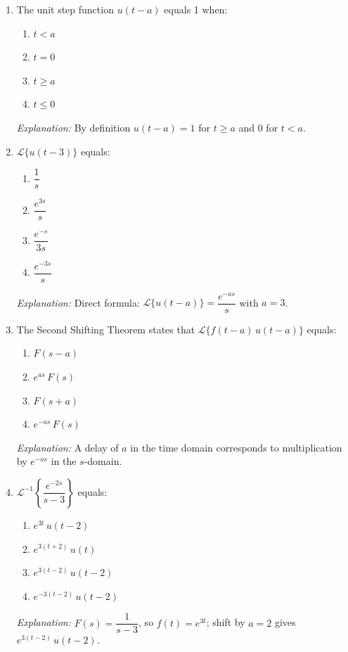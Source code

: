\documentclass[12pt,a4paper]{article}
\begin{document}
\begin{enumerate}[label=\textbf{MCQ \arabic*.}]

\item The unit step function $u(t-a)$ equals 1 when:
  \begin{enumerate}[label=(\alph*)]
    \item $t < a$
    \item $t = 0$
    \item \textbf{$t \geq a$}
    \item $t \leq 0$
  \end{enumerate}
  \textit{Explanation:} By definition $u(t-a) = 1$ for $t \geq a$ and 0 for $t < a$.

\item $\mathcal{L}\{u(t-3)\}$ equals:
  \begin{enumerate}[label=(\alph*)]
    \item $\dfrac{1}{s}$
    \item $\dfrac{e^{3s}}{s}$
    \item $\dfrac{e^{-s}}{3s}$
    \item \textbf{$\dfrac{e^{-3s}}{s}$}
  \end{enumerate}
  \textit{Explanation:} Direct formula: $\mathcal{L}\{u(t-a)\} = \dfrac{e^{-as}}{s}$ with $a=3$.

\item The Second Shifting Theorem states that $\mathcal{L}\{f(t-a)\,u(t-a)\}$ equals:
  \begin{enumerate}[label=(\alph*)]
    \item $F(s-a)$
    \item $e^{as}\,F(s)$
    \item $F(s+a)$
    \item \textbf{$e^{-as}\,F(s)$}
  \end{enumerate}
  \textit{Explanation:} A delay of $a$ in the time domain corresponds to multiplication by $e^{-as}$ in the $s$-domain.

\item $\mathcal{L}^{-1}\!\left\{\dfrac{e^{-2s}}{s-3}\right\}$ equals:
  \begin{enumerate}[label=(\alph*)]
    \item $e^{3t}\,u(t-2)$
    \item $e^{3(t+2)}\,u(t)$
    \item \textbf{$e^{3(t-2)}\,u(t-2)$}
    \item $e^{-3(t-2)}\,u(t-2)$
  \end{enumerate}
  \textit{Explanation:} $F(s) = \dfrac{1}{s-3}$, so $f(t) = e^{3t}$; shift by $a=2$ gives $e^{3(t-2)}\,u(t-2)$.


\end{enumerate}
\end{document}

